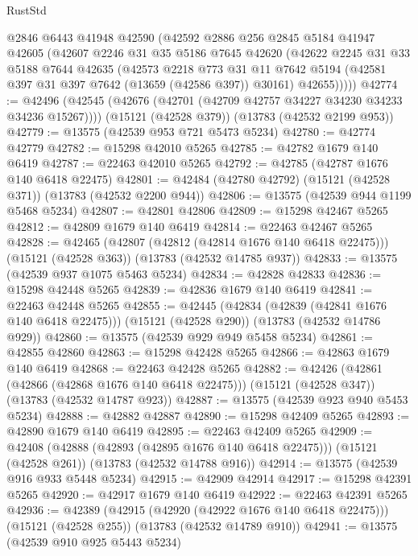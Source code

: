 \begin{lexlean}{RustStd}
\begin{coremodule}
      @2846
      @6443
      @41948
      @42590
      (@42592
        @2886
        @256
        @2845
        @5184
        @41947
        @42605
        (@42607
          @2246
          @31
          @35
          @5186
          @7645
          @42620
          (@42622
            @2245
            @31
            @33
            @5188
            @7644
            @42635
            (@42573
              @2218
              @773
              @31
              @11
              @7642
              @5194
              (@42581 @397 @31 @397 @7642 (@13659 (@42586 @397)) @30161)
              @42655)))))
@42774 := @42496
    (@42545 (@42676 (@42701 (@42709 @42757 @34227 @34230 @34233 @34236 @15267))))
    (@15121 (@42528 @379))
    (@13783 (@42532 @2199 @953))
@42779 := @13575 (@42539 @953 @721 @5473 @5234)
@42780 := @42774 @42779
@42782 := @15298 @42010 @5265
@42785 := @42782 @1679 @140 @6419
@42787 := @22463 @42010 @5265
@42792 := @42785 (@42787 @1676 @140 @6418 @22475)
@42801 := @42484 (@42780 @42792) (@15121 (@42528 @371)) (@13783 (@42532 @2200 @944))
@42806 := @13575 (@42539 @944 @1199 @5468 @5234)
@42807 := @42801 @42806
@42809 := @15298 @42467 @5265
@42812 := @42809 @1679 @140 @6419
@42814 := @22463 @42467 @5265
@42828 := @42465
    (@42807 (@42812 (@42814 @1676 @140 @6418 @22475)))
    (@15121 (@42528 @363))
    (@13783 (@42532 @14785 @937))
@42833 := @13575 (@42539 @937 @1075 @5463 @5234)
@42834 := @42828 @42833
@42836 := @15298 @42448 @5265
@42839 := @42836 @1679 @140 @6419
@42841 := @22463 @42448 @5265
@42855 := @42445
    (@42834 (@42839 (@42841 @1676 @140 @6418 @22475)))
    (@15121 (@42528 @290))
    (@13783 (@42532 @14786 @929))
@42860 := @13575 (@42539 @929 @949 @5458 @5234)
@42861 := @42855 @42860
@42863 := @15298 @42428 @5265
@42866 := @42863 @1679 @140 @6419
@42868 := @22463 @42428 @5265
@42882 := @42426
    (@42861 (@42866 (@42868 @1676 @140 @6418 @22475)))
    (@15121 (@42528 @347))
    (@13783 (@42532 @14787 @923))
@42887 := @13575 (@42539 @923 @940 @5453 @5234)
@42888 := @42882 @42887
@42890 := @15298 @42409 @5265
@42893 := @42890 @1679 @140 @6419
@42895 := @22463 @42409 @5265
@42909 := @42408
    (@42888 (@42893 (@42895 @1676 @140 @6418 @22475)))
    (@15121 (@42528 @261))
    (@13783 (@42532 @14788 @916))
@42914 := @13575 (@42539 @916 @933 @5448 @5234)
@42915 := @42909 @42914
@42917 := @15298 @42391 @5265
@42920 := @42917 @1679 @140 @6419
@42922 := @22463 @42391 @5265
@42936 := @42389
    (@42915 (@42920 (@42922 @1676 @140 @6418 @22475)))
    (@15121 (@42528 @255))
    (@13783 (@42532 @14789 @910))
@42941 := @13575 (@42539 @910 @925 @5443 @5234)

\end{coremodule}
\end{lexlean}
